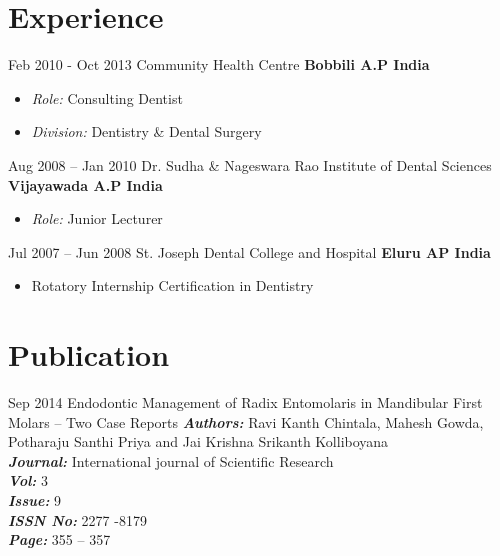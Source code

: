 \documentclass[]{friggeri-cv} %
\begin{document}

\section{Experience}

\begin{entrylist}
\entry
{Feb 2010 - Oct 2013}
{Community Health Centre}
{\bf Bobbili A.P India}
{
\begin{itemize}
	\item \emph{Role:} Consulting Dentist
	\item \emph{Division:} Dentistry \& Dental Surgery
\end{itemize}
}
\entry
{Aug 2008 -- Jan 2010}
{Dr. Sudha \& Nageswara Rao Institute of Dental Sciences}
{\bf Vijayawada A.P India}
{
\begin{itemize}
	\item \emph{Role:} Junior Lecturer\\
\end{itemize}
}
\entry
{Jul 2007 -- Jun 2008}
{St. Joseph Dental College and Hospital}
{\bf Eluru AP India}
{
\begin{itemize}
	\item Rotatory Internship Certification in Dentistry
\end{itemize}
}

\end{entrylist}

\section{Publication}
\begin{entrylist}
\entry
{Sep 2014}
{Endodontic Management of Radix Entomolaris in Mandibular First Molars -- Two Case Reports}
{}
{
	\emph{\bf Authors: } Ravi Kanth Chintala, Mahesh Gowda, Potharaju Santhi Priya and Jai Krishna Srikanth Kolliboyana\\
	\emph{\bf Journal:} International journal of Scientific Research\\
	\emph{\bf Vol:} 3\\
	\emph{\bf Issue:} 9\\
	\emph{\bf ISSN No: } 2277 -8179\\
	\emph{\bf Page: } 355 -- 357\\
}
\end{entrylist}
\newpage
\end{document}
